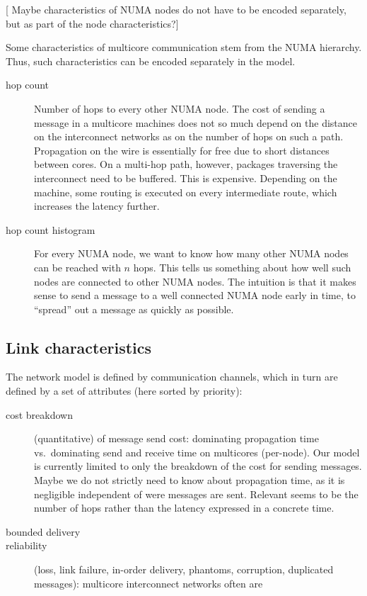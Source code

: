 \documentclass{article}
\newcommand{\stefan}[1]{
  {\color{skRed}[{\color{red}{SK}} #1]}}
\begin{document}
\stefan{Maybe characteristics of NUMA nodes do not have to be encoded
  separately, but as part of the node characteristics?}

Some characteristics of multicore communication stem from the NUMA
hierarchy. Thus, such characteristics can be encoded separately in the
model.

\begin{description}
\item[hop count] Number of hops to every other NUMA node. The cost of
  sending a message in a multicore machines does not so much depend on
  the distance on the interconnect networks as on the number of hops
  on such a path. Propagation on the wire is essentially for free due
  to short distances between cores. %
  On a multi-hop path, however, packages traversing the interconnect
  need to be buffered. This is expensive. Depending on the machine,
  some routing is executed on every intermediate route, which
  increases the latency further.
\item[hop count histogram] For every NUMA node, we want to know how
  many other NUMA nodes can be reached with $n$ hops. This tells us
  something about how well such nodes are connected to other NUMA
  nodes. The intuition is that it makes sense to send a message to a
  well connected NUMA node early in time, to ``spread'' out a message
  as quickly as possible.
\end{description}

\subsection{Link characteristics} 
\label{sec:model_links}

The network model is defined by communication channels, which in turn
are defined by a set of attributes (here sorted by priority):

\begin{description}
\item[cost breakdown] (quantitative) of message send cost:
  dominating propagation time vs.\ dominating send and receive time on
  multicores (per-node). Our model is currently limited to only the
  breakdown of the cost for sending messages. Maybe we do not strictly
  need to know about propagation time, as it is negligible independent
  of were messages are sent. Relevant seems to be the number of hops
  rather than the latency expressed in a concrete time.
\item[bounded delivery]
\item[reliability] (loss, link failure, in-order delivery, phantoms,
  corruption, duplicated messages): 
  multicore interconnect networks often are
\end{description}
\end{document}
